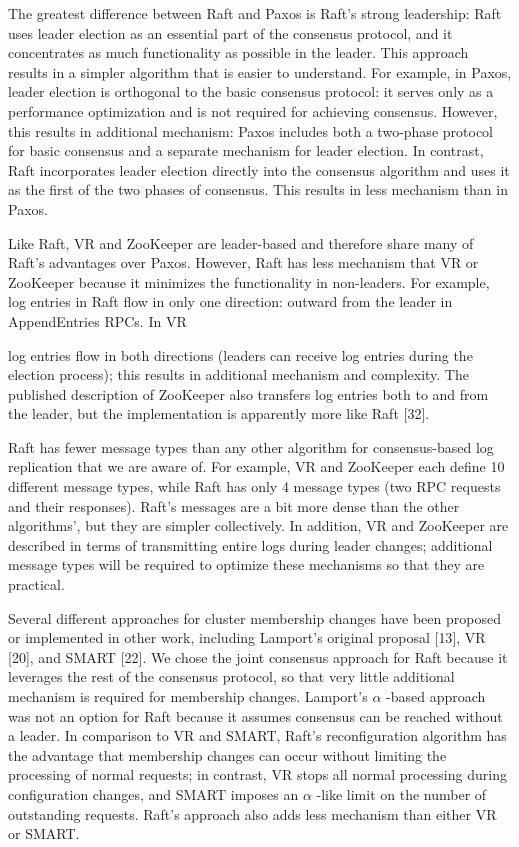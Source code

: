 \documentclass[
]{article}
\begin{document}
The greatest difference between Raft and Paxos is Raft's strong
leadership: Raft uses leader election as an essential part of the
consensus protocol, and it concentrates as much functionality as
possible in the leader. This approach results in a simpler algorithm
that is easier to understand. For example, in Paxos, leader election is
orthogonal to the basic consensus protocol: it serves only as a
performance optimization and is not required for achieving consensus.
However, this results in additional mechanism: Paxos includes both a
two-phase protocol for basic consensus and a separate mechanism for
leader election. In contrast, Raft incorporates leader election directly
into the consensus algorithm and uses it as the first of the two phases
of consensus. This results in less mechanism than in Paxos.

Like Raft, VR and ZooKeeper are leader-based and therefore share many of
Raft's advantages over Paxos. However, Raft has less mechanism that VR
or ZooKeeper because it minimizes the functionality in non-leaders. For
example, log entries in Raft flow in only one direction: outward from
the leader in AppendEntries RPCs. In VR

log entries flow in both directions (leaders can receive log entries
during the election process); this results in additional mechanism and
complexity. The published description of ZooKeeper also transfers log
entries both to and from the leader, but the implementation is
apparently more like Raft {[}32{]}.

Raft has fewer message types than any other algorithm for
consensus-based log replication that we are aware of. For example, VR
and ZooKeeper each define 10 different message types, while Raft has
only 4 message types (two RPC requests and their responses). Raft's
messages are a bit more dense than the other algorithms', but they are
simpler collectively. In addition, VR and ZooKeeper are described in
terms of transmitting entire logs during leader changes; additional
message types will be required to optimize these mechanisms so that they
are practical.

Several different approaches for cluster membership changes have been
proposed or implemented in other work, including Lamport's original
proposal {[}13{]}, VR {[}20{]}, and SMART {[}22{]}. We chose the joint
consensus approach for Raft because it leverages the rest of the
consensus protocol, so that very little additional mechanism is required
for membership changes. Lamport's \(\alpha\) -based approach was not an
option for Raft because it assumes consensus can be reached without a
leader. In comparison to VR and SMART, Raft's reconfiguration algorithm
has the advantage that membership changes can occur without limiting the
processing of normal requests; in contrast, VR stops all normal
processing during configuration changes, and SMART imposes an \(\alpha\)
-like limit on the number of outstanding requests. Raft's approach also
adds less mechanism than either VR or SMART.
\end{document}
